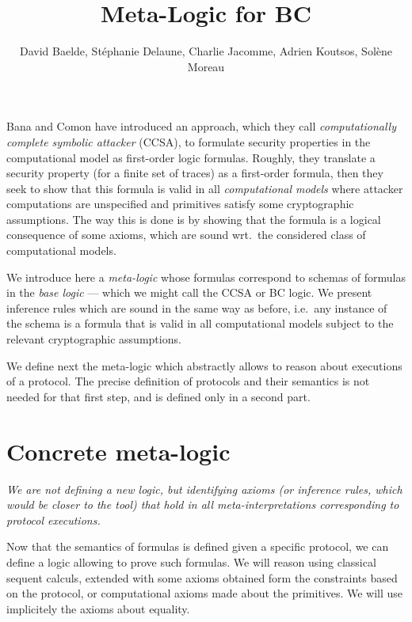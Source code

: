 \documentclass[a4paper]{article}
\theoremstyle{remark}
\begin{document}
\title{Meta-Logic for BC}

\author{David Baelde, Stéphanie Delaune,
  Charlie Jacomme, Adrien Koutsos, Solène Moreau}

\maketitle

\vfill

\tableofcontents

\vfill

\newpage

Bana and Comon have introduced an approach, which they call
\emph{computationally complete symbolic attacker} (CCSA),
to formulate security properties in the computational model as first-order
logic formulas. Roughly, they translate a security property (for a finite set
of traces) as a first-order formula, then they seek to show that this formula
is valid in all \emph{computational models} where attacker computations
are unspecified and primitives satisfy some cryptographic assumptions. The
way this is done is by showing that the formula is a logical consequence of
some axioms, which are sound wrt.\ the considered class of computational
models.

We introduce here a \emph{meta-logic} whose formulas correspond to schemas
of formulas in the \emph{base logic}
--- which we might call the CCSA or BC logic.
We present inference rules which are sound in the same way as before,
i.e.\ any instance of the schema is a formula that is valid in all
computational models subject to the relevant cryptographic assumptions.

We define next the meta-logic which abstractly allows to reason about
executions of a protocol. The precise definition of protocols and their
semantics is not needed for that first step, and is defined only in a
second part.





\section{Concrete meta-logic}

\emph{We are not defining a new logic, but identifying axioms (or inference
rules, which would be closer to the tool) that hold in all
meta-interpretations corresponding to protocol executions.}

Now that the semantics of formulas is defined given a specific protocol, we
can define a logic allowing to prove such formulas. We will reason using
classical sequent calculs, extended with some axioms obtained form the
constraints based on the protocol, or computational axioms made about the
primitives. We will use implicitely the axioms about equality.
\end{document}
